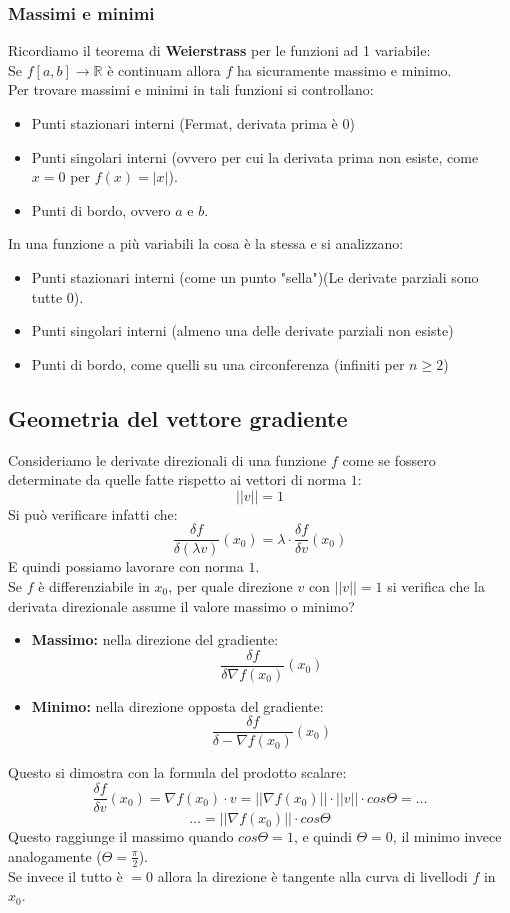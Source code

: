 \documentclass[12pt,a4paper]{article}
\begin{document}
\subsubsection{Massimi e minimi}
Ricordiamo il teorema di \textbf{Weierstrass} per le funzioni ad 1 variabile:\\
Se $f[a,b] \to \mathbb{R}$ è continuam allora $f$ ha sicuramente massimo e minimo.\\
Per trovare massimi e minimi in tali funzioni si controllano:
\begin{itemize}
  \item Punti stazionari interni (Fermat, derivata prima è 0)
  \item Punti singolari interni (ovvero per cui la derivata prima non esiste, come $x=0$ per $f(x) = |x|$).
  \item Punti di bordo, ovvero $a$ e $b$.
\end{itemize}
In una funzione a più variabili la cosa è la stessa e si analizzano:
\begin{itemize}
  \item Punti stazionari interni (come un punto "sella")(Le derivate parziali sono tutte 0).
  \item Punti singolari interni (almeno una delle derivate parziali non esiste)
  \item Punti di bordo, come quelli su una circonferenza (infiniti per $n \geq 2$)
\end{itemize}
\subsection{Geometria del vettore gradiente}
Consideriamo le derivate direzionali di una funzione $f$ come se fossero determinate da quelle fatte rispetto ai vettori di norma $1$:
\[
||v|| = 1
\]
Si può verificare infatti che:
\[
\frac{\delta f}{\delta (\lambda v)}(x_0) = \lambda \cdot \frac{\delta f}{\delta v}(x_0)
\]
E quindi possiamo lavorare con norma $1$.\\
Se $f$ è differenziabile in $x_0$, per quale direzione $v$ con $||v|| = 1$ si verifica che la derivata direzionale assume il valore massimo o minimo?\\
\begin{itemize}
  \item \textbf{Massimo:} nella direzione del gradiente:
  \[
  \frac{\delta f}{\delta \nabla f(x_0)}(x_0)
  \]
  \item \textbf{Minimo:} nella direzione opposta del gradiente:
  \[
  \frac{\delta f}{\delta -\nabla f(x_0)}(x_0)
  \]
\end{itemize}
Questo si dimostra con la formula del prodotto scalare:
\[
  \frac{\delta f}{\delta v}(x_0) = \nabla f(x_0) \cdot v = ||\nabla f(x_0)|| \cdot ||v|| \cdot cos\Theta = \ldots
\]
\[
\ldots = ||\nabla f(x_0)|| \cdot cos\Theta
\]
Questo raggiunge il massimo quando $cos\Theta = 1$, e quindi $\Theta = 0$, il minimo invece analogamente ($\Theta = \frac{\pi}{2}$).\\
Se invece il tutto è $= 0$ allora la direzione è tangente alla curva di livellodi $f$ in $x_0$.
\end{document}
